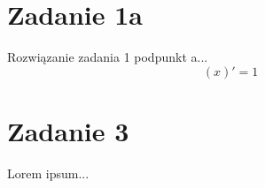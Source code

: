 \documentclass{article}
\begin{document}
\section*{Zadanie 1a}

Rozwiązanie zadania 1 podpunkt a...
\begin{equation*}
    (x)' = 1
\end{equation*}

\section*{Zadanie 3}

Lorem ipsum...
\end{document}
